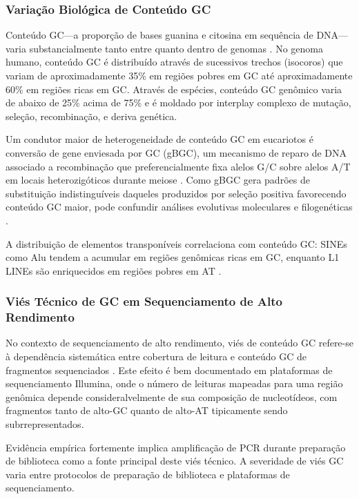 \subsubsection{Variação Biológica de Conteúdo GC}

Conteúdo GC---a proporção de bases guanina e citosina em sequência de DNA---varia substancialmente tanto entre quanto dentro de genomas \parencite{benjamini2012}. No genoma humano, conteúdo GC é distribuído através de sucessivos trechos (isocoros) que variam de aproximadamente 35\% em regiões pobres em GC até aproximadamente 60\% em regiões ricas em GC. Através de espécies, conteúdo GC genômico varia de abaixo de 25\% acima de 75\% e é moldado por interplay complexo de mutação, seleção, recombinação, e deriva genética.

Um condutor maior de heterogeneidade de conteúdo GC em eucariotos é conversão de gene enviesada por GC (gBGC), um mecanismo de reparo de DNA associado a recombinação que preferencialmente fixa alelos G/C sobre alelos A/T em locais heterozigóticos durante meiose \parencite{galtier2001,eyre-walker1993,duret2009,lassalle2015}. Como gBGC gera padrões de substituição indistinguíveis daqueles produzidos por seleção positiva favorecendo conteúdo GC maior, pode confundir análises evolutivas moleculares e filogenéticas \parencite{romiguier2010}.

A distribuição de elementos transponíveis correlaciona com conteúdo GC: SINEs como Alu tendem a acumular em regiões genômicas ricas em GC, enquanto L1 LINEs são enriquecidos em regiões pobres em AT \parencite{richard2008}.

\subsubsection{Viés Técnico de GC em Sequenciamento de Alto Rendimento}

No contexto de sequenciamento de alto rendimento, viés de conteúdo GC refere-se à dependência sistemática entre cobertura de leitura e conteúdo GC de fragmentos sequenciados \parencite{dohm2008,chen2013,browne2020}. Este efeito é bem documentado em plataformas de sequenciamento Illumina, onde o número de leituras mapeadas para uma região genômica depende consideralvelmente de sua composição de nucleotídeos, com fragmentos tanto de alto-GC quanto de alto-AT tipicamente sendo subrrepresentados.

Evidência empírica fortemente implica amplificação de PCR durante preparação de biblioteca como a fonte principal deste viés técnico. A severidade de viés GC varia entre protocolos de preparação de biblioteca e plataformas de sequenciamento.


